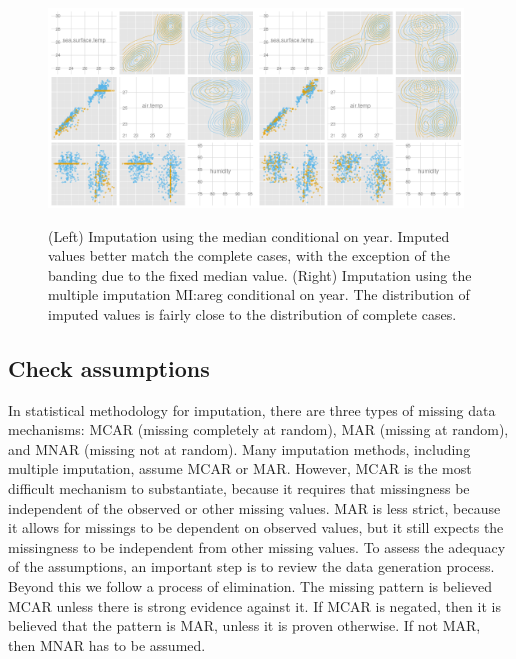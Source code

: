 \documentclass[article]{jss}
\begin{document}
\begin{figure}[htp]
\centerline{\includegraphics[width=0.49\textwidth]{graph/fig4-2-median-condition}\includegraphics[width=0.49\textwidth]{graph/fig4-4-areg-condition}}
\caption{(Left) Imputation using the median conditional on year. Imputed values better match the complete cases, with the exception of the banding due to the fixed median value. (Right) Imputation using the multiple imputation MI:areg conditional on year. The distribution of imputed values is fairly close to the distribution of complete cases.}
\label{fig:tao3}
\end{figure}


\subsection{Check assumptions}

In statistical methodology for imputation, there are three types of missing data mechanisms: MCAR (missing completely at random), MAR (missing at random), and MNAR (missing not at random). Many imputation methods, including multiple imputation, assume MCAR or MAR. However, MCAR is the most difficult mechanism to substantiate, because it requires that missingness be independent of the observed or other missing values. MAR is less strict, because it allows for missings to be dependent on observed values, but it still expects the missingness to be independent from other missing values. To assess the adequacy of the assumptions, an important step is to review the data generation process. Beyond this we follow a process of elimination. The missing pattern is believed MCAR unless there is strong evidence against it. If MCAR is negated, then it is believed that the pattern is MAR, unless it is proven otherwise. If not MAR, then MNAR has to be assumed.
\end{document}
